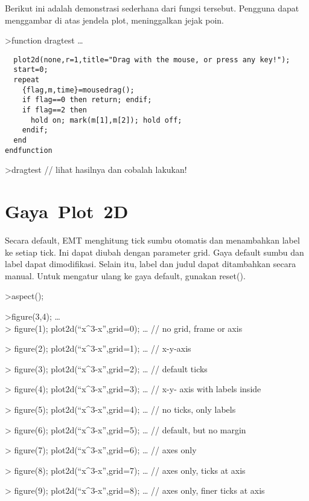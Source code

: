 \documentclass[
]{book}
\begin{document}
Berikut ini adalah demonstrasi sederhana dari fungsi tersebut. Pengguna dapat menggambar di atas jendela plot, meninggalkan jejak poin.

\textgreater function dragtest \ldots{}

\begin{verbatim}
  plot2d(none,r=1,title="Drag with the mouse, or press any key!");
  start=0;
  repeat
    {flag,m,time}=mousedrag();
    if flag==0 then return; endif;
    if flag==2 then
      hold on; mark(m[1],m[2]); hold off;
    endif;
  end
endfunction
\end{verbatim}

\textgreater dragtest // lihat hasilnya dan cobalah lakukan!

\section{Gaya~Plot~2D}\label{gaya-plot-2d}

Secara default, EMT menghitung tick sumbu otomatis dan menambahkan label ke setiap tick. Ini dapat diubah dengan parameter grid. Gaya default sumbu dan label dapat dimodifikasi. Selain itu, label dan judul dapat ditambahkan secara manual. Untuk mengatur ulang ke gaya default, gunakan reset().

\textgreater aspect();

\textgreater figure(3,4); \ldots{}\\
\textgreater{} figure(1); plot2d(``x\^{}3-x'',grid=0); \ldots{} // no grid, frame or axis

\textgreater{} figure(2); plot2d(``x\^{}3-x'',grid=1); \ldots{} // x-y-axis

\textgreater{} figure(3); plot2d(``x\^{}3-x'',grid=2); \ldots{} // default ticks

\textgreater{} figure(4); plot2d(``x\^{}3-x'',grid=3); \ldots{} // x-y- axis with labels inside

\textgreater{} figure(5); plot2d(``x\^{}3-x'',grid=4); \ldots{} // no ticks, only labels

\textgreater{} figure(6); plot2d(``x\^{}3-x'',grid=5); \ldots{} // default, but no margin

\textgreater{} figure(7); plot2d(``x\^{}3-x'',grid=6); \ldots{} // axes only

\textgreater{} figure(8); plot2d(``x\^{}3-x'',grid=7); \ldots{} // axes only, ticks at axis

\textgreater{} figure(9); plot2d(``x\^{}3-x'',grid=8); \ldots{} // axes only, finer ticks at axis
\end{document}
